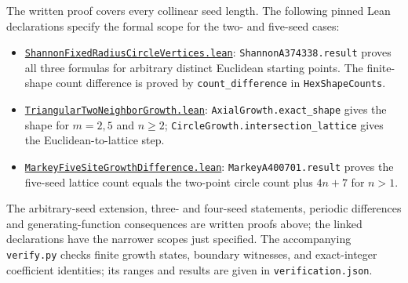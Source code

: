 \documentclass[11pt]{article}
\begin{document}
The written proof covers every collinear seed length. The following pinned Lean
declarations specify the formal scope for the two- and five-seed cases:
\begin{itemize}
\item \href{https://github.com/the-omega-institute/trureturing/blob/2f8421f6b90d37b4815b887f6c60987553831b20/D5/S3/Geometry/ShannonFixedRadiusCircleVertices.lean}{\texttt{ShannonFixedRadiusCircleVertices.lean}}:
\texttt{ShannonA374338.result} proves all three formulas for arbitrary
distinct Euclidean starting points. The finite-shape count difference is
proved by \texttt{count\_difference} in \texttt{HexShapeCounts}.
\item \href{https://github.com/the-omega-institute/trureturing/blob/2f8421f6b90d37b4815b887f6c60987553831b20/D5/S3/StatisticalMechanics/Percolation/TriangularTwoNeighborGrowth.lean}{\texttt{TriangularTwoNeighborGrowth.lean}}:
\texttt{AxialGrowth.exact\_shape} gives the shape for $m=2,5$ and $n\geq2$;
\texttt{CircleGrowth.intersection\_lattice} gives the Euclidean-to-lattice step.
\item \href{https://github.com/the-omega-institute/trureturing/blob/2f8421f6b90d37b4815b887f6c60987553831b20/D5/S3/StatisticalMechanics/Percolation/MarkeyFiveSiteGrowthDifference.lean}{\texttt{MarkeyFiveSiteGrowthDifference.lean}}:
\texttt{MarkeyA400701.result} proves the five-seed lattice count equals
the two-point circle count plus $4n+7$ for $n>1$.
\end{itemize}
The arbitrary-seed extension, three- and four-seed statements, periodic
differences and generating-function consequences are written proofs above;
the linked declarations have the narrower scopes just specified.
The accompanying \texttt{verify.py} checks finite
growth states, boundary witnesses, and exact-integer coefficient identities;
its ranges and results are given in \texttt{verification.json}.
\end{document}
